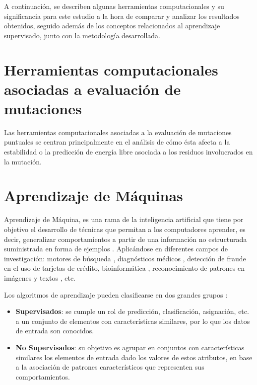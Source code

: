 A continuación, se describen algunas herramientas computacionales y su significancia para este estudio a la hora de comparar y analizar los resultados obtenidos, seguido además de los conceptos relacionados al aprendizaje supervisado, junto con la metodología desarrollada.


\section{Herramientas computacionales asociadas a evaluación de mutaciones}

Las herramientas computacionales asociadas a la evaluación de mutaciones puntuales se centran principalmente en el análisis de cómo ésta afecta a la estabilidad o la predicción de energía libre asociada a los residuos involucrados en la mutación.

\section{Aprendizaje de Máquinas}

Aprendizaje de Máquina, es una rama de la inteligencia artificial que tiene por objetivo el desarrollo de técnicas que permitan a los computadores aprender, es decir, generalizar comportamientos a partir de una información no estructurada suministrada en forma de ejemplos \cite{michie1994machine}. Aplicándose en diferentes campos de investigación: motores de búsqueda \cite{cooley1997web}, diagnósticos médicos \cite{7912315,ABDELAZIZ2018117}, detección de fraude en el uso de tarjetas de crédito, bioinformática \cite{juanito}, reconocimiento de patrones en imágenes \cite{imageA} y textos \cite{netzer2011reading,alm2005emotions}, etc. 


Los algoritmos de aprendizaje pueden clasificarse en dos grandes grupos \cite{michie1994machine}:

\begin{itemize}
	
	\item \textbf{Supervisados}: se cumple un rol de predicción, clasificación, asignación, etc. a un conjunto de elementos con características similares, por lo que los datos de entrada son conocidos.
	
	\item \textbf{No Supervisados}: su objetivo es agrupar en conjuntos con características similares los elementos de entrada dado los valores de estos atributos, en base a la asociación de patrones característicos que representen sus comportamientos.
\end{itemize}

